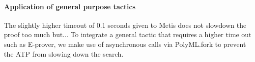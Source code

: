 \documentclass[runningheads,a4paper,draft]{svjour3}
\def\eprover{\textsf{E-prover}\xspace}
\def\metis{\textsf{Metis}\xspace}
\begin{document}
\paragraph{Application of general purpose tactics}
The slightly higher timeout of 0.1 seconds given to \metis does not slowdown 
the proof too much but...
To integrate a general tactic that requires a higher time out such as \eprover, 
we make use of asynchronous calls via PolyML.fork to prevent the ATP 
from slowing down the search. 



%
%


%
\end{document}

